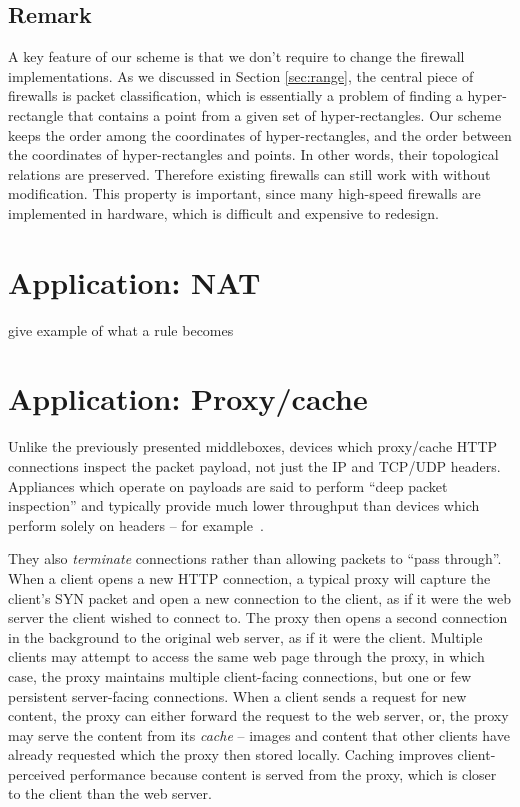 \subsection{Remark}
A key feature of our scheme is that we don't require to change the firewall implementations. As we discussed in Section \ref{sec:range}, the central 
piece of firewalls is packet classification, which is essentially a problem of finding a hyper-rectangle that contains a point from a given set of hyper-rectangles. Our \RM scheme keeps the order among the coordinates of hyper-rectangles, and the order between the coordinates of hyper-rectangles and points. In other words, their topological relations are preserved. Therefore existing firewalls can still work with \sys without modification. This property is important, since many high-speed firewalls are implemented in hardware, which is difficult and expensive to redesign.

\section{Application: NAT}\label{sec:nat}

give example of what a rule becomes

\section{Application: Proxy/cache}\label{sec:proxy}
Unlike the previously presented middleboxes, devices which proxy/cache HTTP connections inspect the packet payload, not just the IP and TCP/UDP headers.
Appliances which operate on payloads are said to perform ``deep packet inspection'' and typically provide much lower throughput than devices which perform
solely on headers -- for example~.


They also {\it terminate} connections rather than allowing packets to ``pass through''.
When a client opens a new HTTP connection, a typical proxy will capture the client's SYN packet and open a new connection to the client, as if it were the web server the client wished to connect to. 
The proxy then opens a second connection in the background to the original web server, as if it were the client. 
Multiple clients may attempt to access the same web page through the proxy, in which case, the proxy maintains multiple client-facing connections, but one or few persistent server-facing connections.
When a client sends a request for new content, the proxy can either forward the request to the web server, or, the proxy may serve the content from its {\it cache} -- images and content that other clients have already requested which the proxy then stored locally. 
Caching improves client-perceived performance because content is served from the proxy, which is closer to the client than the web server.

